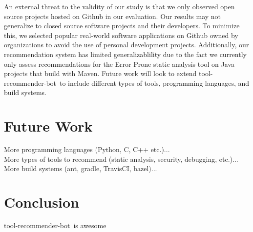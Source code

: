 \documentclass[conference]{IEEEtran}
\newcommand{\tool}{tool-recommender-bot}
\begin{document}
An external threat to the validity of our study is that we only observed open source projects hosted on Github in our evaluation. Our results may not generalize to closed source software projects and their developers. To minimize this, we selected popular real-world software applications on Github owned by organizations to avoid the use of personal development projects. Additionally, our recommendation system has limited generalizablility due to the fact we currently only assess recommendations for the Error Prone static analysis tool on Java projects that build with Maven. Future work will look to extend \tool~to include different types of tools, programming languages, and build systems.

\section{Future Work}

More programming languages (Python, C, C++ etc.)...\\

More types of tools to recommend (static analysis, security, debugging, etc.)... \\

More build systems (ant, gradle, TravisCI, bazel)...\\

\section{Conclusion}

\tool~is awesome




  
%

\end{document}
